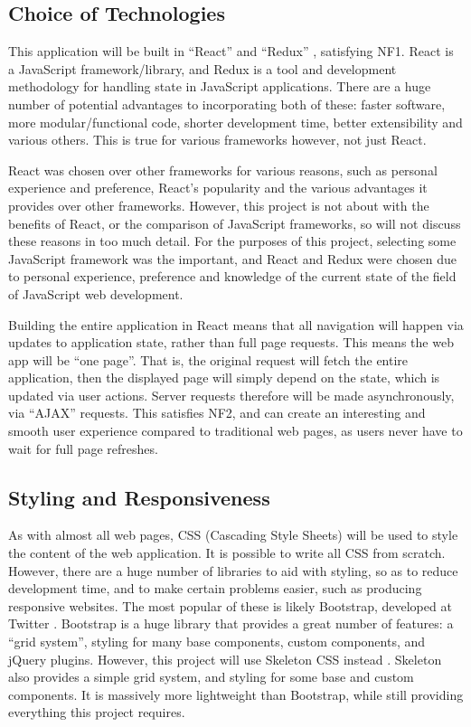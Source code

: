 \documentclass[11pt,openright,a4paper]{report}
\begin{document}
\subsection{Choice of Technologies}
This application will be built in \enquote{React} \parencite{react} and \enquote{Redux} \parencite{redux}, satisfying NF1. React is a JavaScript framework/library, and Redux is a tool and development methodology for handling state in JavaScript applications. There are a huge number of potential advantages to incorporating both of these: faster software, more modular/functional code, shorter development time, better extensibility and various others. This is true for various frameworks however, not just React. 

React was chosen over other frameworks for various reasons, such as personal experience and preference, React's popularity and the various advantages it provides over other frameworks. However, this project is not about with the benefits of React, or the comparison of JavaScript frameworks, so will not discuss these reasons in too much detail. For the purposes of this project, selecting some JavaScript framework was the important, and React and Redux were chosen due to personal experience, preference and knowledge of the current state of the field of JavaScript web development.

Building the entire application in React means that all navigation will happen via updates to application state, rather than full page requests. This means the web app will be \enquote{one page}. That is, the original request will fetch the entire application, then the displayed page will simply depend on the state, which is updated via user actions. Server requests therefore will be made asynchronously, via \enquote{AJAX} requests. This satisfies NF2, and can create an interesting and smooth user experience compared to traditional web pages, as users never have to wait for full page refreshes.

\subsection{Styling and Responsiveness}
As with almost all web pages, CSS (Cascading Style Sheets) will be used to style the content of the web application. It is possible to write all CSS from scratch. However, there are a huge number of libraries to aid with styling, so as to reduce development time, and to make certain problems easier, such as producing responsive websites. The most popular of these is likely Bootstrap, developed at Twitter \parencite{bootstrapcss}. Bootstrap is a huge library that provides a great number of features: a \enquote{grid system}, styling for many base components, custom components, and jQuery plugins. However, this project will use Skeleton CSS instead \parencite{skeletoncss}. Skeleton also provides a simple grid system, and styling for some base and custom components. It is massively more lightweight than Bootstrap, while still providing everything this project requires.
\end{document}
